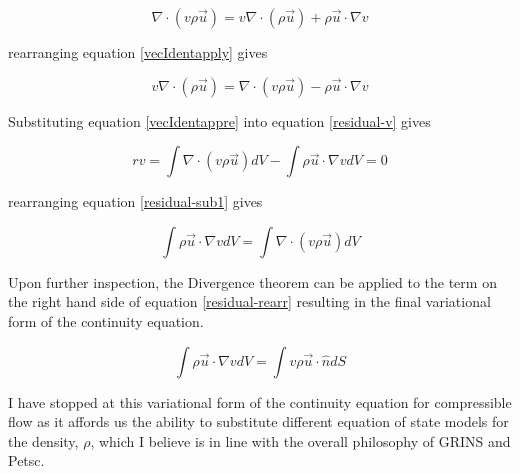 \documentclass{article}
\begin{document}
\begin{equation} \label{vecIdentapply}
\nabla \cdot (v \rho \vec{u}) = v \nabla \cdot (\rho \vec{u}) + \rho \vec{u} \cdot \nabla v
\end{equation}

rearranging equation \ref{vecIdentapply} gives

\begin{equation} \label{vecIdentappre}
v \nabla \cdot (\rho \vec{u}) = \nabla \cdot (v \rho \vec{u}) - \rho \vec{u} \cdot \nabla v
\end{equation}

Substituting equation \ref{vecIdentappre} into equation \ref{residual-v} gives

\begin{equation} \label{residual-sub1}
rv = \int \nabla \cdot (v \rho \vec{u}) dV - \int \rho \vec{u} \cdot \nabla v dV = 0
\end{equation}

rearranging equation \ref{residual-sub1} gives

\begin{equation} \label{residual-rearr}
\int \rho \vec{u} \cdot \nabla v dV = \int \nabla \cdot (v \rho \vec{u}) dV
\end{equation}

Upon further inspection, the Divergence theorem can be applied to the term on the right hand
side of equation \ref{residual-rearr} resulting in the final variational form of the continuity
equation.

\begin{equation}
\int \rho \vec{u} \cdot \nabla v dV = \int v \rho \vec{u} \cdot \hat{n} dS
\end{equation}

I have stopped at this variational form of the continuity equation for compressible flow as it 
affords us the ability to substitute different equation of state models for the density, $\rho$, 
which I believe is in line with the overall philosophy of GRINS and Petsc. 
\end{document}

